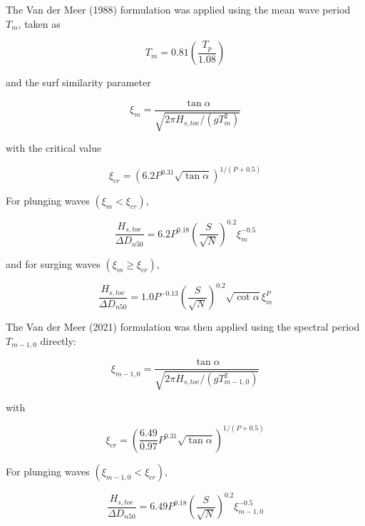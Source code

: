 \documentclass[a4paper, 11pt]{article}
\begin{document}
The Van der Meer (1988) formulation was applied using the mean wave period \(T_m\), taken as

\begin{equation}
    T_m=0.81\left(\frac{T_p}{1.08}\right)
\end{equation}

and the surf similarity parameter

\begin{equation}
    \xi_m=
    \frac{\tan\alpha}
    {\sqrt{2\pi H_{s,toe}/(gT_m^2)}}
\end{equation}

with the critical value

\begin{equation}
    \xi_{cr}=
    \left(6.2P^{0.31}\sqrt{\tan\alpha}\right)^{1/(P+0.5)}
\end{equation}

For plunging waves \((\xi_m<\xi_{cr})\),

\begin{equation}
    \frac{H_{s,toe}}{\Delta D_{n50}}
    =
    6.2P^{0.18}
    \left(\frac{S}{\sqrt{N}}\right)^{0.2}
    \xi_m^{-0.5}
\end{equation}

and for surging waves \((\xi_m\geq\xi_{cr})\),

\begin{equation}
    \frac{H_{s,toe}}{\Delta D_{n50}}
    =
    1.0P^{-0.13}
    \left(\frac{S}{\sqrt{N}}\right)^{0.2}
    \sqrt{\cot\alpha}\xi_m^{P}
\end{equation}

The Van der Meer (2021) formulation was then applied using the spectral period \(T_{m-1,0}\) directly:

\begin{equation}
    \xi_{m-1,0}=
    \frac{\tan\alpha}
    {\sqrt{2\pi H_{s,toe}/(gT_{m-1,0}^{2})}}
\end{equation}

with

\begin{equation}
    \xi_{cr}=
    \left(\frac{6.49}{0.97}P^{0.31}\sqrt{\tan\alpha}\right)^{1/(P+0.5)}
\end{equation}

For plunging waves \((\xi_{m-1,0}<\xi_{cr})\),

\begin{equation}
    \frac{H_{s,toe}}{\Delta D_{n50}}
    =
    6.49P^{0.18}
    \left(\frac{S}{\sqrt{N}}\right)^{0.2}
    \xi_{m-1,0}^{-0.5}
\end{equation}
\end{document}
